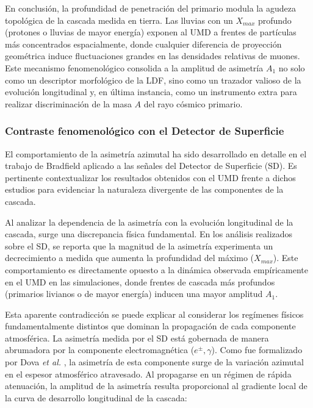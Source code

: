 En conclusión, la profundidad de penetración del primario modula la agudeza topológica de la cascada medida en tierra. Las lluvias con un $X_{max}$ profundo (protones o lluvias de mayor energía) exponen al UMD a frentes de partículas más concentrados espacialmente, donde cualquier diferencia de proyección geométrica induce fluctuaciones grandes en las densidades relativas de muones. Este mecanismo fenomenológico consolida a la amplitud de asimetría $A_1$ no solo como un descriptor morfológico de la LDF, sino como un trazador valioso de la evolución longitudinal y, en última instancia, como un instrumento extra para realizar discriminación de la masa $A$ del rayo cósmico primario.

\subsubsection{Contraste fenomenológico con el Detector de Superficie}
\label{subsec:contraste_sd_bradfield}

El comportamiento de la asimetría azimutal ha sido desarrollado en detalle en el trabajo de Bradfield \cite{BradfieldThesis} aplicado a las señales del Detector de Superficie (SD). Es pertinente contextualizar los resultados obtenidos con el UMD frente a dichos estudios para evidenciar la naturaleza divergente de las componentes de la cascada.

Al analizar la dependencia de la asimetría con la evolución longitudinal de la cascada, surge una discrepancia física fundamental. En los análisis realizados sobre el SD, se reporta que la magnitud de la asimetría experimenta un decrecimiento a medida que aumenta la profundidad del máximo ($X_{max}$). Este comportamiento es directamente opuesto a la dinámica observada empíricamente en el UMD en las simulaciones, donde frentes de cascada más profundos (primarios livianos o de mayor energía) inducen una mayor amplitud $A_1$.

Esta aparente contradicción se puede explicar al considerar los regímenes físicos fundamentalmente distintos que dominan la propagación de cada componente atmosférica. La asimetría medida por el SD está gobernada de manera abrumadora por la componente electromagnética ($e^\pm, \gamma$). Como fue formalizado por Dova \textit{et al.} \cite{dova2003}, la asimetría de esta componente surge de la variación azimutal en el espesor atmosférico atravesado. Al propagarse en un régimen de rápida atenuación, la amplitud de la asimetría resulta proporcional al gradiente local de la curva de desarrollo longitudinal de la cascada:

